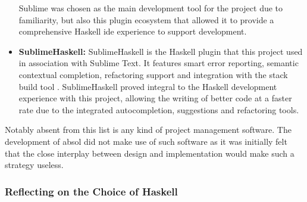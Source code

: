 \begin{itemize}
    Sublime was chosen as the main development tool for the project due to familiarity, but also this plugin ecosystem that allowed it to provide a comprehensive Haskell \gls{ide} experience to support development.
    \item \textbf{SublimeHaskell:} SublimeHaskell is the Haskell plugin that this project used in association with Sublime Text. 
    It features smart error reporting, semantic contextual completion, refactoring support and integration with the stack build tool \citep{sublime_haskell}. 
    SublimeHaskell proved integral to the Haskell development experience with this project, allowing the writing of better code at a faster rate due to the integrated autocompletion, suggestions and refactoring tools. 
\end{itemize}

Notably absent from this list is any kind of project management software.
The development of \gls{absol} did not make use of such software as it was initially felt that the close interplay between design and implementation would make such a strategy useless.

\subsubsection{Reflecting on the Choice of Haskell} %
\label{ssub:reflecting_on_the_choice_of_haskell}

